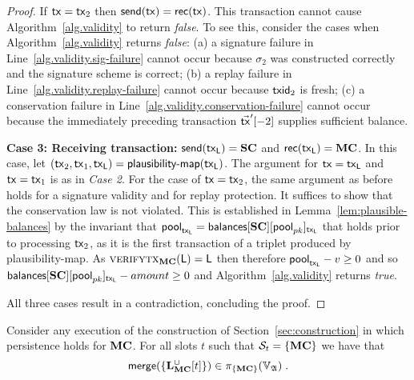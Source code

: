 \begin{proof}
  If $\mathsf{tx} = \mathsf{tx}_2$ then $\mathsf{send}(\mathsf{tx}) = \mathsf{rec}(\mathsf{tx})$. This transaction cannot cause
  Algorithm~\ref{alg.validity} to return \emph{false}. To see this, consider the
  cases when Algorithm~\ref{alg.validity} returns \emph{false}: (a) a signature
  failure in Line~\ref{alg.validity.sig-failure} cannot occur because $\sigma_2$
  was constructed correctly and the signature scheme is correct; (b) a replay
  failure in Line~\ref{alg.validity.replay-failure} cannot occur because
  $\mathsf{txid}_2$ is fresh; (c) a conservation failure in
  Line~\ref{alg.validity.conservation-failure} cannot occur because the
  immediately preceding transaction $\vec{\mathsf{tx}}'[-2]$ supplies sufficient balance.

  \textbf{Case 3: Receiving transaction:} $\mathsf{send}(\mathsf{tx}_{\mathsf{L}}) = \mathbf{SC}$ and
  $\mathsf{rec}(\mathsf{tx}_{\mathsf{L}}) = \mathbf{MC}$. In this case, let
  $(\mathsf{tx}_2, \mathsf{tx}_1, \mathsf{tx}_{\mathsf{L}}) = \textsf{plausibility-map}(\mathsf{tx}_{\mathsf{L}})$.
  The argument for $\mathsf{tx} = \mathsf{tx}_{\mathsf{L}}$ and $\mathsf{tx} = \mathsf{tx}_1$ is as in \emph{Case 2}. For
  the case of $\mathsf{tx} = \mathsf{tx}_2$, the same argument as before holds for a signature
  validity and for replay protection. It suffices to show that the conservation
  law is not violated. This is established in Lemma~\ref{lem:plausible-balances}
  by the invariant that $\textsf{pool}_{\mathsf{tx}_{\mathsf{L}}} =
  \textsf{balances}[\mathbf{SC}][\textsf{pool}_{pk}]_{\mathsf{tx}_{\mathsf{L}}}$ that holds prior to
  processing $\mathsf{tx}_2$, as it is the first transaction of a triplet produced by
  \textsf{plausibility-map}. As $\textsc{verifytx}_{\mathbf{MC}}(\mathsf{L}) =
  \mathsf{L}$ then therefore $\textsf{pool}_{\mathsf{tx}_{\mathsf{L}}} - v \geq 0$
  and so $\textsf{balances}[\mathbf{SC}][\textsf{pool}_{pk}]_{\mathsf{tx}_{\mathsf{L}}} - amount \geq 0$
  and Algorithm~\ref{alg.validity} returns \emph{true}.

  All three cases result in a contradiction, concluding the proof.
\end{proof}

\begin{lemma}\label{lem:catastrophe-firewall}
  Consider any execution of the construction of Section~\ref{sec:construction}
  in which persistence holds for $\mathbf{MC}$.
  For all slots $t$ such that $\mathcal{S}_t = \{\mathbf{MC}\}$
  we have that
  $$
    \mathsf{merge}(\{\mathbf{L}_{\mathbf{MC}}^\cup[t]\})
    \in
    \pi_{\{\mathbf{MC}\}}(\mathbb{V}_{\mathfrak{A}})
  \; .
  $$
\end{lemma}

